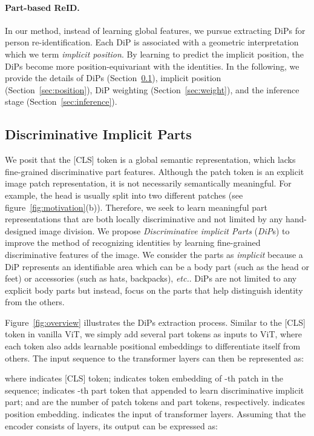 \documentclass[10pt,twocolumn,letterpaper]{article}
\begin{document}
\vspace{-0.4cm}
\paragraph{Part-based ReID.}
In our method, instead of learning global features, we pursue extracting DiPs for person re-identification. 
Each DiP is associated with a geometric interpretation which we term \textit{implicit position}. By learning to predict the implicit position, the DiPs become more position-equivariant with the identities.
In the following, we provide the details of DiPs (Section~\ref{sec:dip}), implicit position (Section~\ref{sec:position}), DiP weighting (Section~\ref{sec:weight}), and the inference stage (Section~\ref{sec:inference}).


\subsection{Discriminative Implicit Parts}
\label{sec:dip}
We posit that the [CLS] token is a global semantic representation, which lacks fine-grained discriminative part features. Although the patch token is an explicit image patch representation, it is not necessarily semantically meaningful. For example, the head is usually split into two different patches (see figure~\ref{fig:motivation}(b)). Therefore, we seek to learn meaningful part representations that are both locally discriminative and not limited by any hand-designed image division. We propose \textit{Discriminative implicit Parts} (\textit{DiP}s) to improve the method of recognizing identities by learning fine-grained discriminative features of the image. 
We consider the parts as \textit{implicit} because a DiP represents an identifiable area which can be a body part (such as the head or feet) or accessories (such as hats, backpacks), \textit{etc.}. DiPs are not limited to any explicit body parts but instead, focus on the parts that help distinguish identity from the others.

Figure~\ref{fig:overview} illustrates the DiPs extraction process. Similar to the [CLS] token in vanilla ViT, we simply add several part tokens as inputs to ViT, where each token also adds learnable positional embeddings to differentiate itself from others. The input sequence to the transformer layers can then be represented as:

where  indicates [CLS] token;  indicates token embedding of -th patch in the sequence;  indicates -th part token that appended to learn discriminative implicit part;  and  are the number of patch tokens and part tokens, respectively. indicates position embedding.  indicates the input of transformer layers. Assuming that the encoder consists of  layers, its output  can be expressed as:
\end{document}
